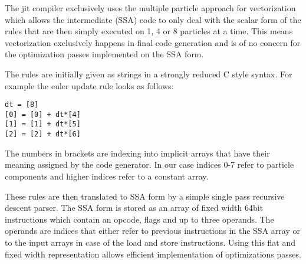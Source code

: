 The jit compiler exclusively uses the multiple particle approach for vectorization which allows the intermediate (SSA) code to only deal with the scalar form of the rules that are then simply executed on 1, 4 or 8 particles at a time. This means vectorization exclusively happens in final code generation and is of no concern for the optimization passes implemented on the SSA form.

The rules are initially given as strings in a strongly reduced C style syntax. For example the euler update rule looks as follows:
\begin{lstlisting}
dt = [8]
[0] = [0] + dt*[4]
[1] = [1] + dt*[5]
[2] = [2] + dt*[6]
\end{lstlisting}
The numbers in brackets are indexing into implicit arrays that have their meaning assigned by the code generator. In our case indices 0-7 refer to particle components and higher indices refer to a constant array.

These rules are then translated to SSA form by a simple single pass recursive descent parser. The SSA form is stored as an array of fixed width 64bit instructions which contain an opcode, flags and up to three operands. The operands are indices that either refer to previous instructions in the SSA array or to the input arrays in case of the load and store instructions. Using this flat and fixed width representation allows efficient implementation of optimizations passes.


